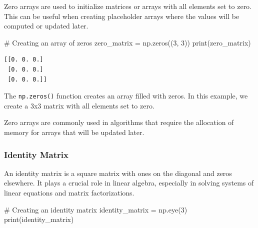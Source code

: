 \documentclass[
  letterpaper,
  DIV=11,
  numbers=noendperiod]{scrreprt}
\newenvironment{Shaded}{\begin{snugshade}}{\end{snugshade}}
\newcommand{\BuiltInTok}[1]{\textcolor[rgb]{0.00,0.23,0.31}{#1}}
\newcommand{\CommentTok}[1]{\textcolor[rgb]{0.37,0.37,0.37}{#1}}
\newcommand{\DecValTok}[1]{\textcolor[rgb]{0.68,0.00,0.00}{#1}}
\newcommand{\NormalTok}[1]{\textcolor[rgb]{0.00,0.23,0.31}{#1}}
\newcommand{\OperatorTok}[1]{\textcolor[rgb]{0.37,0.37,0.37}{#1}}
\theoremstyle{plain}
\theoremstyle{definition}
\theoremstyle{remark}
\begin{document}
Zero arrays are used to initialize matrices or arrays with all elements
set to zero. This can be useful when creating placeholder arrays where
the values will be computed or updated later.

\begin{Shaded}
\begin{Highlighting}[]
\CommentTok{\# Creating an array of zeros}
\NormalTok{zero\_matrix }\OperatorTok{=}\NormalTok{ np.zeros((}\DecValTok{3}\NormalTok{, }\DecValTok{3}\NormalTok{))}
\BuiltInTok{print}\NormalTok{(zero\_matrix)}
\end{Highlighting}
\end{Shaded}

\begin{verbatim}
[[0. 0. 0.]
 [0. 0. 0.]
 [0. 0. 0.]]
\end{verbatim}

The \texttt{np.zeros()} function creates an array filled with zeros. In
this example, we create a 3x3 matrix with all elements set to zero.

\begin{tcolorbox}[enhanced jigsaw, leftrule=.75mm, bottomtitle=1mm, colback=white, toptitle=1mm, opacitybacktitle=0.6, toprule=.15mm, colbacktitle=quarto-callout-note-color!10!white, arc=.35mm, colframe=quarto-callout-note-color-frame, title=\textcolor{quarto-callout-note-color}{\faInfo}\hspace{0.5em}{Use:}, titlerule=0mm, rightrule=.15mm, left=2mm, bottomrule=.15mm, breakable, coltitle=black, opacityback=0]

Zero arrays are commonly used in algorithms that require the allocation
of memory for arrays that will be updated later.

\end{tcolorbox}

\subsubsection{Identity Matrix}\label{identity-matrix}

An identity matrix is a square matrix with ones on the diagonal and
zeros elsewhere. It plays a crucial role in linear algebra, especially
in solving systems of linear equations and matrix factorizations.

\begin{Shaded}
\begin{Highlighting}[]
\CommentTok{\# Creating an identity matrix}
\NormalTok{identity\_matrix }\OperatorTok{=}\NormalTok{ np.eye(}\DecValTok{3}\NormalTok{)}
\BuiltInTok{print}\NormalTok{(identity\_matrix)}
\end{Highlighting}
\end{Shaded}
\end{document}
